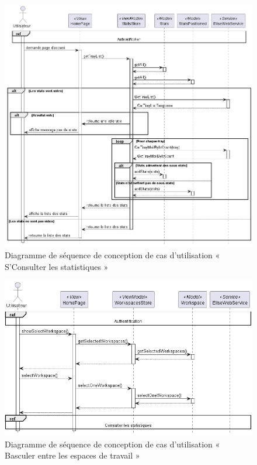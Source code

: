 \begin{figure}[H]
  \centering
  \includegraphics[width=1\textwidth]{out/diagrams/sprint7/sequence_view_stats/sequence_view_stats}
  \caption{Diagramme de séquence de conception de cas d'utilisation « S'Consulter les statistiques »}
  \label{fig:sequence_conception_consulter_statistiques}
\end{figure}

\begin{figure}[H]
  \centering
  \includegraphics[width=1\textwidth]{out/diagrams/sprint7/sequence_switch_workspace/sequence_switch_workspace}
  \caption{Diagramme de séquence de conception de cas d'utilisation « Basculer entre les espaces de travail »}
  \label{fig:sequence_conception_sequence_switch_workspace}
\end{figure}


